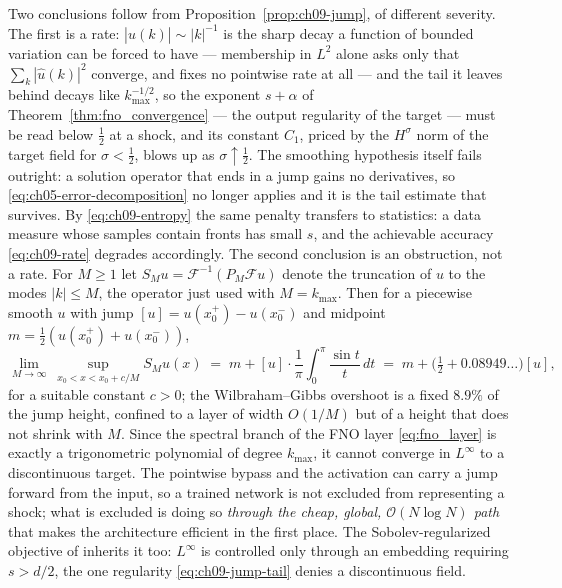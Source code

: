 Two conclusions follow from Proposition~\ref{prop:ch09-jump}, of different
severity. The first is a rate:
$|\hat{u}(k)|\sim|k|^{-1}$ is the sharp decay a function of bounded variation can
be forced to have --- membership in $L^2$ alone asks only that
$\sum_k|\hat{u}(k)|^2$ converge, and fixes no pointwise rate at all --- and the
tail it leaves behind decays like $k_{\max}^{-1/2}$, so the exponent $s+\alpha$ of
Theorem~\ref{thm:fno_convergence} --- the output regularity of the target ---
must be read below $\tfrac12$ at a shock, and its constant $C_1$, priced by the
$H^{\sigma}$ norm of the target field for $\sigma<\tfrac12$, blows up as
$\sigma\uparrow\tfrac12$. The smoothing hypothesis itself fails outright: a
solution operator that ends in a jump gains no derivatives, so
\eqref{eq:ch05-error-decomposition} no longer applies and it is the tail
estimate that survives.
By \eqref{eq:ch09-entropy} the same penalty transfers to statistics: a data
measure whose samples contain fronts has small $s$, and the achievable
accuracy \eqref{eq:ch09-rate} degrades accordingly. The second conclusion is an
obstruction, not a rate. For $M\ge1$ let $S_M u=\mathcal{F}^{-1}(P_M\mathcal{F}u)$
denote the truncation of $u$ to the modes $|k|\le M$, the operator just used with
$M=k_{\max}$. Then for a piecewise smooth $u$ with jump
$[u]=u(x_0^+)-u(x_0^-)$ and midpoint $m=\tfrac12(u(x_0^+)+u(x_0^-))$,
\begin{equation}
  \lim_{M\to\infty}\ \sup_{x_0<x<x_0+c/M} S_M u(x)
  \;=\; m + [u]\cdot\frac{1}{\pi}\int_0^{\pi}\frac{\sin t}{t}\,dt
  \;=\; m+\Big(\tfrac12 + 0.08949\ldots\Big)[u],
  \label{eq:ch09-gibbs}
\end{equation}
for a suitable constant $c>0$; the Wilbraham--Gibbs overshoot is a fixed
$8.9\%$ of the jump height, confined to a layer of width $O(1/M)$ but of a
height that does not shrink with $M$. Since the
spectral branch of the FNO layer \eqref{eq:fno_layer} is exactly a trigonometric
polynomial of degree $k_{\max}$, it cannot converge in $L^\infty$ to a
discontinuous target. The pointwise bypass and the activation can carry a jump
forward from the input, so a trained network is not excluded from representing a
shock; what is excluded is doing so \emph{through the cheap, global,
$\mathcal{O}(N\log N)$ path} that makes the architecture efficient in the first
place. The Sobolev-regularized objective of
 inherits it too:
$L^\infty$ is controlled only through an embedding requiring $s>d/2$,
the one regularity \eqref{eq:ch09-jump-tail} denies a discontinuous field.

